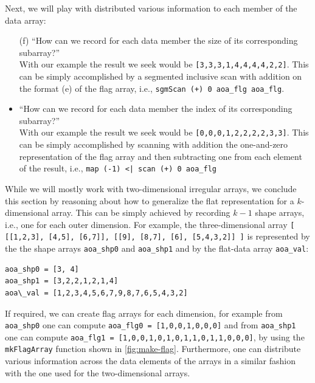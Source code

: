 \documentclass[acmsmall,review]{acmart}\settopmatter{printfolios=true,printccs=false,printacmref=false}
\begin{document}
Next, we will play with distributed various information
to each member of the data array:
\begin{itemize}
    \item[(f)] ``How can we record for each
                 data member the size of its corresponding subarray?''\\
                With our example the result we seek would be
                {\tt[3,3,3,1,4,4,4,4,2,2]}. This can be simply
                accomplished by a segmented inclusive scan with addition
                on the format (e) of the flag array, i.e.,
                \lstinline{sgmScan (+) 0 aoa_flg aoa_flg}.
   \item[(g)] ``How can we record for each
                 data member the index of its corresponding subarray?''\\
                With our example the result we seek would be
                {\tt[0,0,0,1,2,2,2,2,3,3]}. This can be simply
                accomplished by scanning with addition the
                one-and-zero representation of the flag array
                and then subtracting one from each element of
                the result, i.e., 
                \lstinline{map (-1) <| scan (+) 0 aoa_flg}
\end{itemize}

While we will mostly work with two-dimensional irregular arrays, 
we conclude this section by reasoning about how to generalize 
the flat representation for a $k$-dimensional array. This 
can be simply achieved by recording $k-1$ shape arrays,
i.e., one for each outer dimension.
For example, the three-dimensional array
{\tt [ [[1,2,3], [4,5], [6,7]], [[9], [8,7], [6], [5,4,3,2]] ]}
is represented by the the shape arrays {\tt aoa\_shp0} and
{\tt aoa\_shp1} and by the flat-data array {\tt aoa\_val}:
\begin{lstlisting}[mathescape=true]
aoa_shp0 = [3, 4]
aoa_shp1 = [3,2,2,1,2,1,4]
aoa\_val = [1,2,3,4,5,6,7,9,8,7,6,5,4,3,2]
\end{lstlisting}\vspace{-2ex}
If required, we can create flag arrays for each dimension,
for example from {\tt aoa\_shp0} one can compute
{\tt aoa\_flg0 = [1,0,0,1,0,0,0]} and from {\tt aoa\_shp1}
one can compute {\tt aoa\_flg1 = [1,0,0,1,0,1,0,1,1,0,1,1,0,0,0]},
by using the {\tt mkFlagArray} function shown in \cref{fig:make-flag}.
Furthermore, one can distribute various information across the 
data elements of the arrays in a similar fashion with the one 
used for the two-dimensional arrays.   
\end{document}

